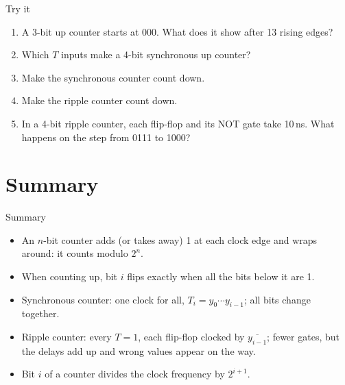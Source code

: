 \documentclass[10pt]{wosm-slides}
\begin{document}
\begin{frame}{Try it}
  \begin{enumerate}
    \item A 3-bit up counter starts at 000. What does it show after 13 rising
      edges?\par
    \item Which $T$ inputs make a 4-bit synchronous up counter?\par
    \item Make the synchronous counter count down.\par
    \item Make the ripple counter count down.\par
    \item In a 4-bit ripple counter, each flip-flop and its NOT gate take 10\,ns.
      What happens on the step from 0111 to 1000?\par
  \end{enumerate}
\end{frame}

\section{Summary}

\begin{frame}{Summary}
  \begin{itemize}
    \item An $n$-bit counter adds (or takes away) 1 at each clock edge and wraps
      around: it counts modulo $2^n$.
    \item When counting up, bit $i$ flips exactly when all the bits below it are 1.
    \item Synchronous counter: one clock for all, $T_i = y_0 \cdots y_{i-1}$; all
      bits change together.
    \item Ripple counter: every $T = 1$, each flip-flop clocked by
      $\overline{y_{i-1}}$; fewer gates, but the delays add up and wrong values
      appear on the way.
    \item Bit $i$ of a counter divides the clock frequency by $2^{i+1}$.
  \end{itemize}
\end{frame}
\end{document}
